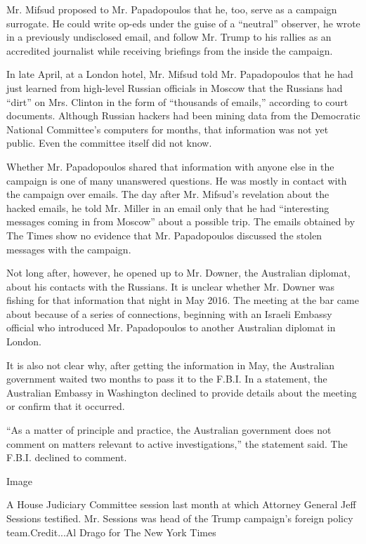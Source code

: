 Mr. Mifsud proposed to Mr. Papadopoulos that he, too, serve as a
campaign surrogate. He could write op-eds under the guise of a
``neutral'' observer, he wrote in a previously undisclosed email, and
follow Mr. Trump to his rallies as an accredited journalist while
receiving briefings from the inside the campaign.

In late April, at a London hotel, Mr. Mifsud told Mr. Papadopoulos that
he had just learned from high-level Russian officials in Moscow that the
Russians had ``dirt'' on Mrs. Clinton in the form of ``thousands of
emails,'' according to court documents. Although Russian hackers had
been mining data from the Democratic National Committee's computers for
months, that information was not yet public. Even the committee itself
did not know.

Whether Mr. Papadopoulos shared that information with anyone else in the
campaign is one of many unanswered questions. He was mostly in contact
with the campaign over emails. The day after Mr. Mifsud's revelation
about the hacked emails, he told Mr. Miller in an email only that he had
``interesting messages coming in from Moscow'' about a possible trip.
The emails obtained by The Times show no evidence that Mr. Papadopoulos
discussed the stolen messages with the campaign.

Not long after, however, he opened up to Mr. Downer, the Australian
diplomat, about his contacts with the Russians. It is unclear whether
Mr. Downer was fishing for that information that night in May 2016. The
meeting at the bar came about because of a series of connections,
beginning with an Israeli Embassy official who introduced Mr.
Papadopoulos to another Australian diplomat in London.

It is also not clear why, after getting the information in May, the
Australian government waited two months to pass it to the F.B.I. In a
statement, the Australian Embassy in Washington declined to provide
details about the meeting or confirm that it occurred.

``As a matter of principle and practice, the Australian government does
not comment on matters relevant to active investigations,'' the
statement said. The F.B.I. declined to comment.

Image

A House Judiciary Committee session last month at which Attorney General
Jeff Sessions testified. Mr. Sessions was head of the Trump campaign's
foreign policy team.Credit...Al Drago for The New York Times

